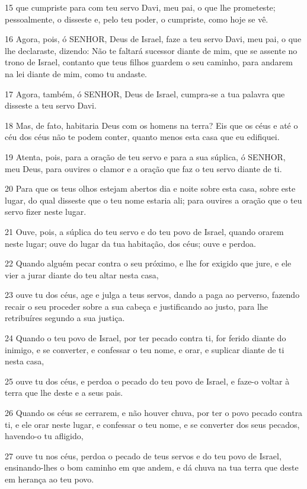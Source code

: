 \par 15 que cumpriste para com teu servo Davi, meu pai, o que lhe prometeste; pessoalmente, o disseste e, pelo teu poder, o cumpriste, como hoje se vê.
\par 16 Agora, pois, ó SENHOR, Deus de Israel, faze a teu servo Davi, meu pai, o que lhe declaraste, dizendo: Não te faltará sucessor diante de mim, que se assente no trono de Israel, contanto que teus filhos guardem o seu caminho, para andarem na lei diante de mim, como tu andaste.
\par 17 Agora, também, ó SENHOR, Deus de Israel, cumpra-se a tua palavra que disseste a teu servo Davi.
\par 18 Mas, de fato, habitaria Deus com os homens na terra? Eis que os céus e até o céu dos céus não te podem conter, quanto menos esta casa que eu edifiquei.
\par 19 Atenta, pois, para a oração de teu servo e para a sua súplica, ó SENHOR, meu Deus, para ouvires o clamor e a oração que faz o teu servo diante de ti.
\par 20 Para que os teus olhos estejam abertos dia e noite sobre esta casa, sobre este lugar, do qual disseste que o teu nome estaria ali; para ouvires a oração que o teu servo fizer neste lugar.
\par 21 Ouve, pois, a súplica do teu servo e do teu povo de Israel, quando orarem neste lugar; ouve do lugar da tua habitação, dos céus; ouve e perdoa.
\par 22 Quando alguém pecar contra o seu próximo, e lhe for exigido que jure, e ele vier a jurar diante do teu altar nesta casa,
\par 23 ouve tu dos céus, age e julga a teus servos, dando a paga ao perverso, fazendo recair o seu proceder sobre a sua cabeça e justificando ao justo, para lhe retribuíres segundo a sua justiça.
\par 24 Quando o teu povo de Israel, por ter pecado contra ti, for ferido diante do inimigo, e se converter, e confessar o teu nome, e orar, e suplicar diante de ti nesta casa,
\par 25 ouve tu dos céus, e perdoa o pecado do teu povo de Israel, e faze-o voltar à terra que lhe deste e a seus pais.
\par 26 Quando os céus se cerrarem, e não houver chuva, por ter o povo pecado contra ti, e ele orar neste lugar, e confessar o teu nome, e se converter dos seus pecados, havendo-o tu afligido,
\par 27 ouve tu nos céus, perdoa o pecado de teus servos e do teu povo de Israel, ensinando-lhes o bom caminho em que andem, e dá chuva na tua terra que deste em herança ao teu povo.
